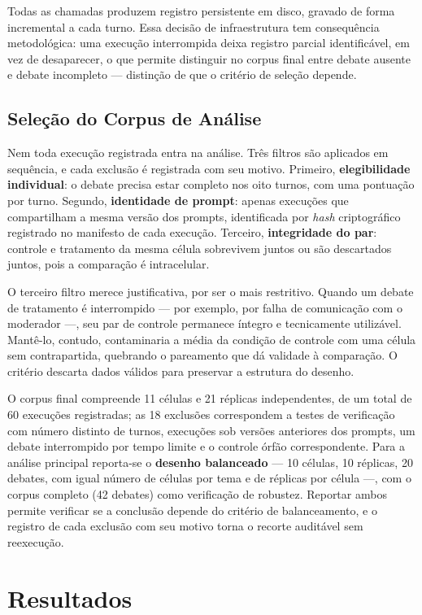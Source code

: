 \documentclass[conference]{IEEEtran} \IEEEoverridecommandlockouts %
\begin{document}
Todas as chamadas produzem registro persistente em disco, gravado de forma
incremental a cada turno. Essa decisão de infraestrutura tem consequência
metodológica: uma execução interrompida deixa registro parcial identificável, em
vez de desaparecer, o que permite distinguir no corpus final entre debate
ausente e debate incompleto — distinção de que o critério de seleção depende.

\subsection{Seleção do Corpus de Análise}

Nem toda execução registrada entra na análise. Três filtros são aplicados em
sequência, e cada exclusão é registrada com seu motivo. Primeiro,
\textbf{elegibilidade individual}: o debate precisa estar completo nos oito
turnos, com uma pontuação por turno. Segundo, \textbf{identidade de prompt}:
apenas execuções que compartilham a mesma versão dos prompts, identificada por
\textit{hash} criptográfico registrado no manifesto de cada execução. Terceiro,
\textbf{integridade do par}: controle e tratamento da mesma célula sobrevivem
juntos ou são descartados juntos, pois a comparação é intracelular.

O terceiro filtro merece justificativa, por ser o mais restritivo. Quando um
debate de tratamento é interrompido — por exemplo, por falha de comunicação com
o moderador —, seu par de controle permanece íntegro e tecnicamente utilizável.
Mantê-lo, contudo, contaminaria a média da condição de controle com uma célula
sem contrapartida, quebrando o pareamento que dá validade à comparação. O
critério descarta dados válidos para preservar a estrutura do desenho.

O corpus final compreende 11 células e 21 réplicas independentes, de um total
de 60 execuções registradas; as 18 exclusões correspondem a testes de
verificação com número distinto de turnos, execuções sob versões anteriores dos
prompts, um debate interrompido por tempo limite e o controle órfão
correspondente. Para a análise principal reporta-se o \textbf{desenho
balanceado} — 10 células, 10 réplicas, 20 debates, com igual número de células
por tema e de réplicas por célula —, com o corpus completo (42 debates) como
verificação de robustez. Reportar ambos permite verificar se a conclusão depende
do critério de balanceamento, e o registro de cada exclusão com seu motivo
torna o recorte auditável sem reexecução.

\section{Resultados}
\end{document}
